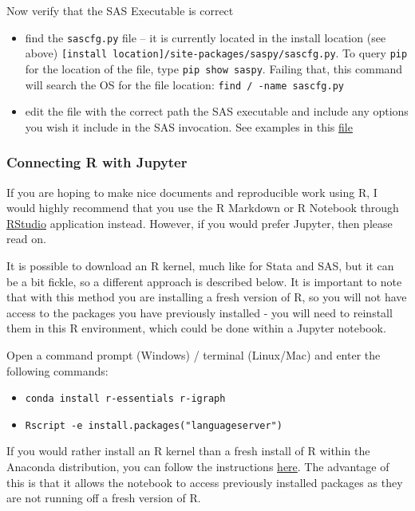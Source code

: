 \documentclass[]{book}
\providecommand{\tightlist}{%
  \setlength{\itemsep}{0pt}\setlength{\parskip}{0pt}}
\begin{document}
Now verify that the SAS Executable is correct

\begin{itemize}
\tightlist
\item
  find the \texttt{sascfg.py} file -- it is currently located in the install location (see above) \texttt{{[}install\ location{]}/site-packages/saspy/sascfg.py}. To query \texttt{pip} for the location of the file, type \texttt{pip\ show\ saspy}. Failing that, this command will search the OS for the file location: \texttt{find\ /\ -name\ sascfg.py}
\item
  edit the file with the correct path the SAS executable and include any options you wish it include in the SAS invocation. See examples in this \href{https://Github.com/sassoftware/saspy/blob/master/saspy/sascfg.py}{file}
\end{itemize}

\hypertarget{connecting-r-with-jupyter}{%
\subsubsection{Connecting R with Jupyter}\label{connecting-r-with-jupyter}}

If you are hoping to make nice documents and reproducible work using R, I would highly recommend that you use the R Markdown or R Notebook through \href{https://www.rstudio.com/products/rstudio/download/}{RStudio} application instead. However, if you would prefer Jupyter, then please read on.

It is possible to download an R kernel, much like for Stata and SAS, but it can be a bit fickle, so a different approach is described below. It is important to note that with this method you are installing a fresh version of R, so you will not have access to the packages you have previously installed - you will need to reinstall them in this R environment, which could be done within a Jupyter notebook.

Open a command prompt (Windows) / terminal (Linux/Mac) and enter the following commands:

\begin{itemize}
\tightlist
\item
  \texttt{conda\ install\ r-essentials\ r-igraph}
\item
  \texttt{Rscript\ -e\ \textquotesingle{}install.packages("languageserver")\textquotesingle{}}
\end{itemize}

If you would rather install an R kernel than a fresh install of R within the Anaconda distribution, you can follow the instructions \href{https://richpauloo.Github.io/2018-05-16-Installing-the-R-kernel-in-Jupyter-Lab/}{here}. The advantage of this is that it allows the notebook to access previously installed packages as they are not running off a fresh version of R.
\end{document}
